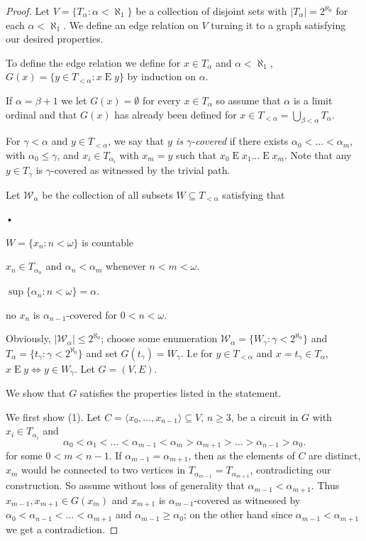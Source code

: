 \documentclass[a4paper]{amsart}
\theoremstyle{plain}
\theoremstyle{definition}
\theoremstyle{remark}
\numberwithin{equation}{section}
\newcommand{\E}{\mathrel{E}}
\begin{document}
\begin{proof}
Let $V=\{T_\alpha:\alpha<\aleph_1\}$ be a collection of disjoint sets with $|T_\alpha|=2^{\aleph_0}$ for each $\alpha<\aleph_1$. We define an edge relation on $V$ turning it to a graph satisfying our desired properties. 

To define the edge relation we define for $x\in T_\alpha$ and $\alpha<\aleph_1$, $G(x)=\{y\in T_{<\alpha}: x\E y\}$ by induction on $\alpha$.

If $\alpha=\beta+1$ we let $G(x)=\emptyset$ for every $x\in T_\alpha$ so assume that $\alpha$ is a limit ordinal and that $G(x)$ has already been defined for $x\in T_{<\alpha}=\bigcup_{\beta<\alpha} T_\alpha$.

For $\gamma<\alpha$ and $y\in T_{<\alpha}$, we say that \emph{$y$ is $\gamma$-covered} if there exists $\alpha_0<\dots<\alpha_m$, with $\alpha_0\leq \gamma$, and $x_i\in T_{\alpha_i}$ with $x_m=y$ such that $x_0\E x_1\dots \E x_m$.  Note that any $y\in T_\gamma$ is $\gamma$-covered as witnessed by the trivial path.

Let $\mathcal{W}_\alpha$ be the collection of all subsets $W\subseteq T_{<\alpha}$ satisfying that
\begin{list}{•}{}
\item $W=\{x_n: n<\omega\}$ is countable
\item $x_n\in T_{\alpha_n}$ and $\alpha_n<\alpha_m$ whenever $n<m<\omega$.
\item $\sup\{\alpha_n:n<\omega\}=\alpha$.
\item no $x_n$ is $\alpha_{n-1}$-covered for $0<n<\omega$.
\end{list}
Obviously, $|\mathcal{W}_\alpha|\leq 2^{\aleph_0}$; choose some enumeration $\mathcal{W}_\alpha=\{W_\gamma:\gamma<2^{\aleph_0}\}$ and $T_\alpha=\{t_\gamma:\gamma<2^{\aleph_0}\}$ and set $G(t_\gamma)=W_\gamma$. I.e for $y\in T_{<\alpha}$ and $x=t_\gamma\in T_\alpha$, $x\E y\iff y\in W_\gamma$. Let $G=(V,E)$.

We show that $G$ satisfies the properties listed in the statement.

We first show (1). Let $C=\langle x_0,\dots, x_{n-1}\rangle\subseteq V$, $n\geq 3$, be a circuit in $G$ with $x_i\in T_{\alpha_i}$ and
\[\alpha_0<\alpha_1<\dots<\alpha_{m-1}<\alpha_m>\alpha_{m+1}>\dots>\alpha_{n-1}>\alpha_0.\] for some $0<m<n-1$. If $\alpha_{m-1}= \alpha_{m+1}$, then as the elements of $C$ are distinct, $x_m$ would be connected to two vertices in $T_{\alpha_{m-1}}=T_{\alpha_{m+1}}$, contradicting our construction. So assume without loss of generality that $\alpha_{m-1}<\alpha_{m+1}$. Thus $x_{m-1},x_{m+1}\in G(x_m)$ and $x_{m+1}$ is $\alpha_{m-1}$-covered as witnessed by $\alpha_0<\alpha_{n-1}<\dots<\alpha_{m+1}$ and $\alpha_{m-1}\geq \alpha_0$; on the other hand since $\alpha_{m-1}<\alpha_{m+1}$ we get a contradiction.


\end{proof}
\end{document}

